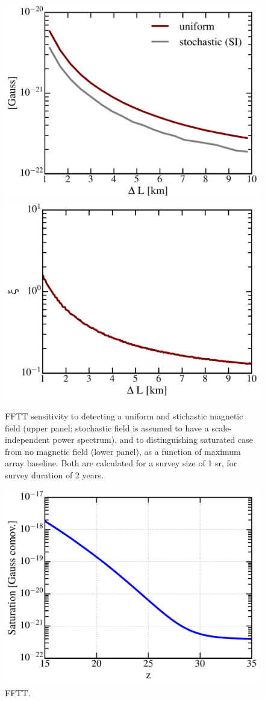 \begin{figure}
\centering
\includegraphics[width=.35\textwidth,keepaspectratio=true]{sigma_vs_deltas.pdf}
\includegraphics[width=.35\textwidth,keepaspectratio=true]{xi_vs_deltas.pdf}
\caption{FFTT sensitivity to detecting a uniform and stichastic magnetic field (upper panel; stochastic field is assumed to have a scale-independent power spectrum), and to distinguishing saturated case from no magnetic field (lower panel), as a function of maximum array baseline. Both are calculated for a survey size of 1 sr, for survey duration of 2 years.\label{fig:sigma_vs_deltas}}
\end{figure}
\begin{figure}
\centering
\includegraphics[width=.35\textwidth,keepaspectratio=true]{Bsaturation.pdf}
\caption{FFTT.\label{fig:Bsat}}
\end{figure}